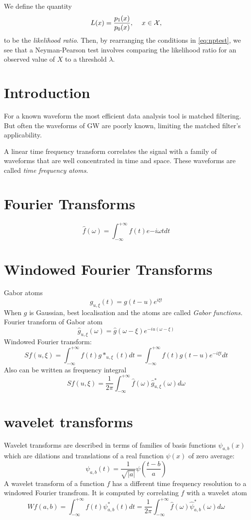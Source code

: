 We define the quantity 
\begin{equation}
L(x)=\frac{p_1(x)}{p_0(x)}, \hspace{12pt} x\in\mathcal{X},
\end{equation}
to be the \textit{likelihood ratio}. Then, by rearranging the conditions in \ref{eq:nptest}, we see that a Neyman-Pearson test involves comparing the likelihood ratio for an observed value of $X$ to a threshold $\lambda$. 

\section{Introduction}     
For a known waveform the most efficient data analysis tool is matched filtering. But often the waveforms of GW are poorly known, limiting the matched filter's applicability. 

A linear time frequency transform correlates the signal with a family of waveforms that are well concentrated in time and space. These waveforms are called \textit{time frequency atoms}.

\section{Fourier Transforms}
\[\hat{f}(\omega)=\int^{+\infty}_{-\infty}f(t)e{-i\omega t}dt \]

\section{Windowed Fourier Transforms}
Gabor atoms 
\[ g_{u,\xi} (t)=g(t-u)e^{i\xi t} \]
When $g$ is Gaussian, best localisation and the atoms are called \textit{Gabor functions.} Fourier transform of Gabor atom
\[ \hat{g}_{u,\xi} (\omega) =\hat{g}(\omega-\xi) e^{-iu(\omega-\xi)} \]
Windowed Fourier transform:
\[ Sf(u,\xi)=\int^{+\infty}_{-\infty}f(t)g*_{u,\xi}(t)dt=\int^{+\infty}_{-\infty}f(t)g(t-u)e^{-i\xi t}dt \]
Also can be written as frequency integral
\[ Sf(u,\xi)=\frac{1}{2\pi}\int^{+\infty}_{-\infty}\hat{f}(\omega)\hat{g}^{*}_{u,\xi}(\omega)d\omega \]

\section{wavelet transforms}
Wavelet transforms are described in terms of families of basis functions $\psi_{a,b}(x)$ which are dilations and translations of a real function $\psi(x)$ of zero average:
\[ \psi_{a,b}(t)=\frac{1}{\sqrt{|a|}}\psi\left(\frac{t-b}{a}\right) \]
A wavelet transform of a function $f$ has a different time frequency resolution to a windowed Fourier transfrom. It is computed by correlating $f$ with a wavelet atom 
\[Wf(a,b)=\int^{+\infty}_{-\infty}f(t)\psi^{*}_{a,b}(t)dt=\frac{1}{2\pi}\int^{+\infty}_{-\infty} \hat{f}(\omega)\hat{\psi}^{*}_{a,b}(\omega) d\omega \]


